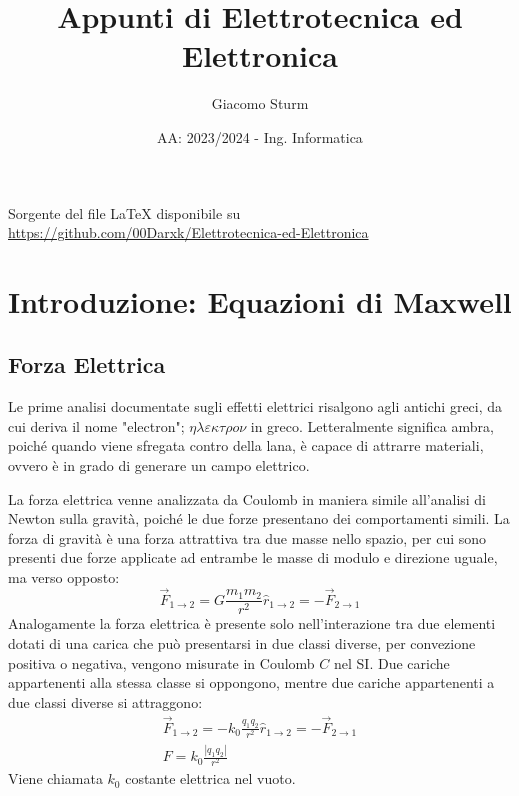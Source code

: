 \documentclass{article}
\title{Appunti di Elettrotecnica ed Elettronica}
\author{Giacomo Sturm}
\date{AA: 2023/2024 - Ing. Informatica}
\numberwithin{equation}{subsection}
\begin{document}
\maketitle

\vspace{10mm}

\begin{center}
    Sorgente del file LaTeX disponibile su \url{https://github.com/00Darxk/Elettrotecnica-ed-Elettronica}
\end{center}

\clearpage

\tableofcontents

\clearpage

\section{Introduzione: Equazioni di Maxwell}

\subsection{Forza Elettrica}
Le prime analisi documentate sugli effetti elettrici risalgono agli antichi greci, da cui deriva il nome "electron"; $\eta\lambda\varepsilon\kappa\tau\rho o\nu$ in greco. Letteralmente significa ambra, poiché 
quando viene sfregata contro della lana, è capace di attrarre materiali, ovvero è in grado di generare un campo elettrico.

La forza elettrica venne analizzata da Coulomb in maniera simile all'analisi di Newton sulla gravità, poiché le due forze presentano dei comportamenti simili. La forza di 
gravità è una forza attrattiva tra due masse nello spazio, per cui sono presenti due forze applicate ad entrambe le masse di modulo e direzione uguale, ma verso opposto: 
\begin{equation*}
    \vec{F}_{1\to2}=G\displaystyle\frac{m_1m_2}{r^2}\hat{r}_{1\to2}=-\vec{F}_{2\to1}
\end{equation*}
Analogamente la forza elettrica è presente solo nell'interazione tra due elementi dotati di una carica che può presentarsi in due classi diverse, per convezione 
positiva o negativa, vengono misurate in Coulomb $C$ nel SI. Due cariche appartenenti alla stessa classe si oppongono, mentre due cariche appartenenti a due classi diverse 
si attraggono:
\begin{gather}
    \vec{F}_{1\to2}=-k_0\displaystyle\frac{q_1q_2}{r^2}\hat{r}_{1\to2}=-\vec{F}_{2\to1}\\
    F=k_0\displaystyle\frac{|q_1q_2|}{r^2}
\end{gather} 
Viene chiamata $k_0$ costante elettrica nel vuoto. 
\end{document}
